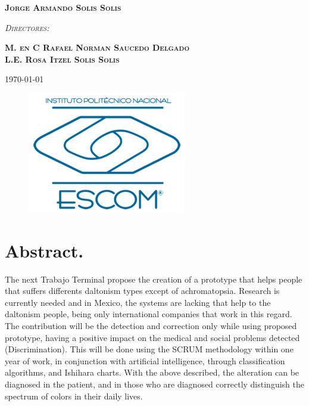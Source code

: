 \documentclass[10pt]{article}
\begin{document}
\begin{center}
\textsc{\Large \bfseries Jorge Armando Solis Solis }\\[2.00cm]
								

\begin{center}
\textsc{\Large \itshape Directores:}\\[0.4cm]
\end{center}

\textsc{\Large \bfseries
M. en C Rafael Norman Saucedo Delgado \\
L.E. Rosa Itzel Solis Solis  }\\[2.00cm]

\end{center}							 											

\begin{minipage}{1.00\textwidth} \begin{flushright}
\textsc{\normalsize \today}\\[0.4cm]
\end{flushright}\end{minipage}


\begin{figure}[b]
\raggedright
\includegraphics[scale = 0.25]{Imagenes/logo.png}
\end{figure}

																				
\newpage																		

\section{Abstract.}
The next Trabajo Terminal propose the creation of a prototype that helps people that suffers differents daltonism types except of achromatopsia. Research is currently needed and in Mexico, the systems are lacking that help to the daltonism people, being only international companies that work in this regard. The contribution will be the detection and correction only while using proposed prototype, having a positive impact on the medical and social problems detected (Discrimination). This will be done using the SCRUM methodology within one year of work, in conjunction with artificial intelligence, through classification algorithms, and Ishihara charts. With the above described, the alteration can be diagnosed in the patient, and in those who are diagnosed correctly distinguish the spectrum of colors in their daily lives.
\end{document}
